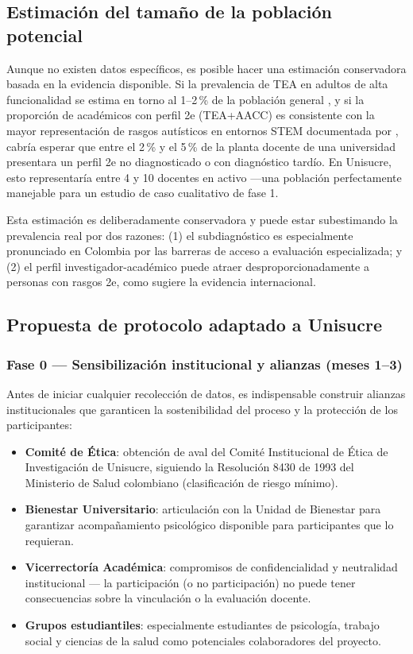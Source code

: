\subsection{Estimación del tamaño de la población potencial}

Aunque no existen datos específicos, es posible hacer una estimación conservadora
basada en la evidencia disponible. Si la prevalencia de TEA en adultos de alta
funcionalidad se estima en torno al 1--2\,\% de la población general
\parencite{maenner2023}, y si la proporción de académicos con perfil 2e (TEA+AACC)
es consistente con la mayor representación de rasgos autísticos en entornos
STEM documentada por \textcite{baron-cohen2001}, cabría esperar que entre el
2\,\% y el 5\,\% de la planta docente de una universidad presentara un perfil
2e no diagnosticado o con diagnóstico tardío. En Unisucre, esto representaría
entre 4 y 10 docentes en activo —una población perfectamente manejable para
un estudio de caso cualitativo de fase 1.

Esta estimación es deliberadamente conservadora y puede estar subestimando
la prevalencia real por dos razones: (1) el subdiagnóstico es especialmente
pronunciado en Colombia por las barreras de acceso a evaluación especializada;
y (2) el perfil investigador-académico puede atraer desproporcionadamente a
personas con rasgos 2e, como sugiere la evidencia internacional.

\subsection{Propuesta de protocolo adaptado a Unisucre}

\subsubsection{Fase 0 — Sensibilización institucional y alianzas (meses 1--3)}

Antes de iniciar cualquier recolección de datos, es indispensable construir
alianzas institucionales que garanticen la sostenibilidad del proceso y la
protección de los participantes:

\begin{itemize}[leftmargin=*, itemsep=2pt]
    \item \textbf{Comité de Ética}: obtención de aval del Comité Institucional
    de Ética de Investigación de Unisucre, siguiendo la Resolución 8430 de 1993
    del Ministerio de Salud colombiano (clasificación de riesgo mínimo).
    \item \textbf{Bienestar Universitario}: articulación con la Unidad de Bienestar
    para garantizar acompañamiento psicológico disponible para participantes
    que lo requieran.
    \item \textbf{Vicerrectoría Académica}: compromisos de confidencialidad y
    neutralidad institucional — la participación (o no participación) no puede
    tener consecuencias sobre la vinculación o la evaluación docente.
    \item \textbf{Grupos estudiantiles}: especialmente estudiantes de psicología,
    trabajo social y ciencias de la salud como potenciales colaboradores del proyecto.
\end{itemize}


